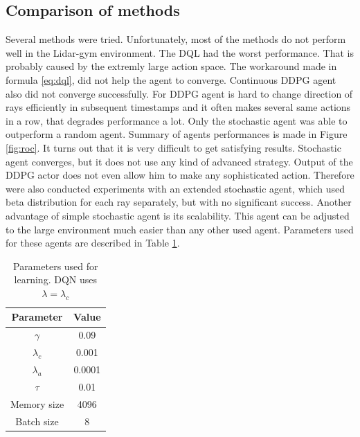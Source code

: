 \subsection{Comparison of methods}
Several methods were tried. Unfortunately, most of the methods do not perform well in the Lidar-gym environment. The DQL had the worst performance. That is probably caused by the extremly large action space. The workaround made in formula \eqref{eq:dql}, did not help the agent to converge. Continuous DDPG agent also did not converge successfully. For DDPG agent is hard to change direction of rays efficiently in subsequent timestamps and it often makes several same actions in a row, that degrades performance a lot. Only the stochastic agent was able to outperform a random agent. Summary of agents performances is made in Figure \ref{fig:roc}. It turns out that it is very difficult to get satisfying results. Stochastic agent converges, but it does not use any kind of advanced strategy. Output of the DDPG actor does not even allow him to make any sophisticated action. Therefore were also conducted experiments with an extended stochastic agent, which used beta distribution for each ray separately, but with no significant success. Another advantage of simple stochastic agent is its scalability. This agent can be adjusted to the large environment much easier than any other used agent. Parameters used for these agents are described in Table \ref{tab:params}.

\clearpage

\begin{table}[h!]
  \centering
  \begin{tabular}{*{2}{c}}
    \toprule
    Parameter & Value \\
    \midrule
    $\gamma$ & 0.09 \\
    $\lambda_{c}$ & 0.001 \\
    $\lambda_{a}$ & 0.0001 \\
    $\tau$ & 0.01 \\
    Memory size & 4096 \\
    Batch size & 8 \\
    \bottomrule
  \end{tabular}
  \caption[Learning parameters]{Parameters used for learning. DQN uses $\lambda = \lambda_{c}$}
  \label{tab:params}
\end{table}

